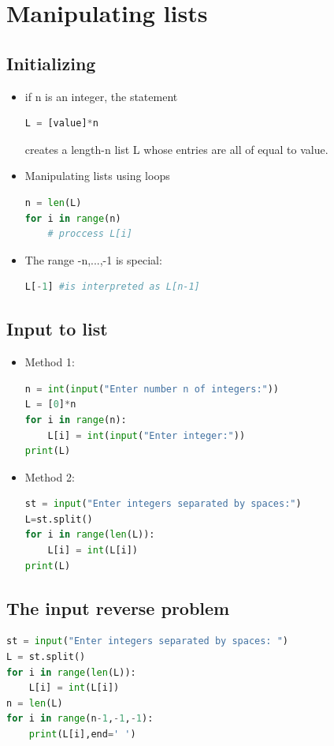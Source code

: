 \documentclass[12pt,oneside]{book}
\begin{document}
\section{Manipulating lists}
\subsection{Initializing}
\begin{itemize}
	\item if n is an integer, the statement
\begin{lstlisting}[language=python]
L = [value]*n
\end{lstlisting}
creates a length-n list L whose entries are all of equal to value.
	\item Manipulating lists using loops
	      \begin{lstlisting}[language=python]
n = len(L)
for i in range(n)
	# proccess L[i]
\end{lstlisting}
	\item The range -n,...,-1 is special:
\begin{lstlisting}[language=python]
L[-1] #is interpreted as L[n-1]
\end{lstlisting}
\end{itemize}
\subsection{Input to list}
\begin{itemize}
	\item Method 1:
\begin{lstlisting}[language=python]
n = int(input("Enter number n of integers:"))
L = [0]*n 
for i in range(n):
	L[i] = int(input("Enter integer:"))
print(L)
\end{lstlisting}
	\item Method 2:
\begin{lstlisting}[language=python]
st = input("Enter integers separated by spaces:")
L=st.split()
for i in range(len(L)):
	L[i] = int(L[i])
print(L)
\end{lstlisting}
\end{itemize}
\subsection{The input reverse problem}
\begin{lstlisting}[language=python]
st = input("Enter integers separated by spaces: ")
L = st.split()
for i in range(len(L)):
	L[i] = int(L[i])
n = len(L)
for i in range(n-1,-1,-1):
	print(L[i],end=' ')
\end{lstlisting}
\end{document}
